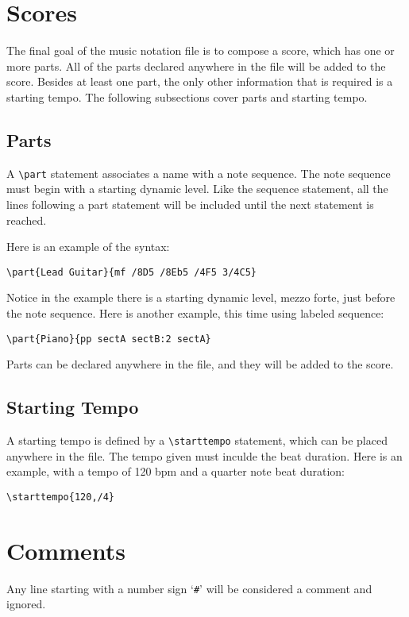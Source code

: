 \documentclass{scrartcl}
\begin{document}
\section{Scores}
The final goal of the music notation file is to compose a score, which has one or more parts. All of the parts declared anywhere in the file will be added to the score. Besides at least one part, the only other information that is required is a starting tempo. The following subsections cover parts and starting tempo.

\subsection{Parts}
A \verb|\part| statement associates a name with a note sequence. The note sequence must begin with a starting dynamic level. Like the sequence statement, all the lines following a part statement will be included until the next statement is reached. 

Here is an example of the syntax:

\begin{tabbing}
  \hspace{0.5in}\= \verb|\part{Lead Guitar}{mf /8D5 /8Eb5 /4F5 3/4C5}|
\end{tabbing}

Notice in the example there is a starting dynamic level, mezzo forte, just before the note sequence. Here is another example, this time using labeled sequence:

\begin{tabbing}
  \hspace{0.5in}\= \verb|\part{Piano}{pp sectA sectB:2 sectA}| \\
\end{tabbing}

Parts can be declared anywhere in the file, and they will be added to the score.

\subsection{Starting Tempo}
A starting tempo is defined by a \verb|\starttempo| statement, which can be placed anywhere in the file. The tempo given must inculde the beat duration. Here is an example, with a tempo of 120 bpm and a quarter note beat duration:

\begin{tabbing}
  \hspace{0.5in}\= \verb|\starttempo{120,/4}|
\end{tabbing}

\section{Comments}
Any line starting with a number sign `\verb|#|' will be considered a comment and ignored.
\end{document}
